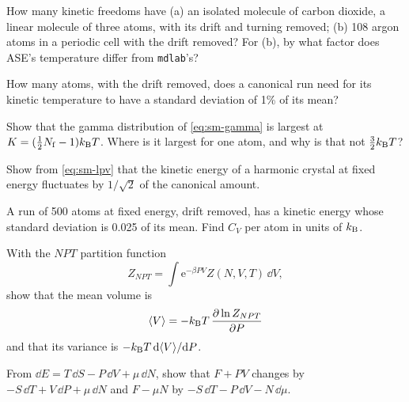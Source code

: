 \begin{exercise}
\label{ex:sm-freedoms}
How many kinetic freedoms have (a) an isolated molecule of carbon
dioxide, a linear molecule of three atoms, with its drift and turning
removed; (b) 108 argon atoms in a periodic cell with the drift removed?
For (b), by what factor does ASE's temperature differ from
\texttt{mdlab}'s?
\end{exercise}

\begin{exercise}
\label{ex:sm-scatter}
How many atoms, with the drift removed, does a canonical run need for its
kinetic temperature to have a standard deviation of 1\% of its mean?
\end{exercise}

\begin{exercise}
\label{ex:sm-mode}
Show that the gamma distribution of \cref{eq:sm-gamma} is largest at $K
= (\frac12N_{\mathrm f} - 1)k_{\mathrm{B}} T$. Where is it largest for one atom,
and why is that not $\frac32k_{\mathrm{B}} T$?
\end{exercise}

\begin{exercise}
\label{ex:sm-harmonic}
Show from \cref{eq:sm-lpv} that the kinetic energy of a harmonic
crystal at fixed energy fluctuates by $1/\sqrt2$ of the canonical amount.
\end{exercise}

\begin{exercise}
\label{ex:sm-heat}
A run of 500 atoms at fixed energy, drift removed, has a kinetic energy
whose standard deviation is 0.025 of its mean. Find $C_V$ per atom in
units of $k_{\mathrm{B}}$.
\end{exercise}

\begin{exercise}
\label{ex:sm-volume}
With the $NPT$ partition function
\begin{equation*}
   Z_{NPT} = \int\mathrm{e}^{-\beta PV}Z(N, V, T)\,\dd V ,
\end{equation*}
show that the mean volume is
\begin{equation*}
   \langle V \rangle = -k_{\mathrm{B}} T\,\frac{\partial\ln Z_{NPT}}{\partial P}
\end{equation*}
and that its variance is $-k_{\mathrm{B}} T\,\mathrm{d}\langle V \rangle/\mathrm{d} P$.
\end{exercise}

\begin{exercise}
\label{ex:sm-legendre}
From $\dd E = T\,\dd S - P\,\dd V + \mu\,\dd N$, show that $F + PV$ changes
by $-S\,\dd T + V\,\dd P + \mu\,\dd N$ and $F - \mu N$ by $-S\,\dd T -
P\,\dd V - N\,\dd\mu$.
\end{exercise}

